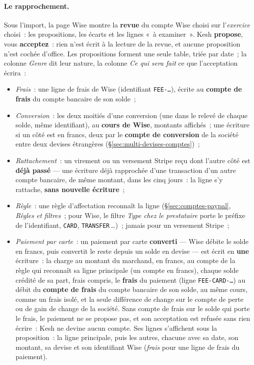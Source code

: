 \documentclass[a4paper,11pt,oneside]{article}
\begin{document}
\paragraph{Le rapprochement.} Sous l'import, la page Wise montre la \textbf{revue} du compte Wise choisi sur l'\emph{exercice} choisi~: les propositions, les écarts et les lignes «~à examiner~». Kesh \textbf{propose}, vous \textbf{acceptez}~: rien n'est écrit à la lecture de la revue, et aucune proposition n'est cochée d'office. Les propositions forment une seule table, triée par date~; la colonne \emph{Genre} dit leur nature, la colonne \emph{Ce qui sera fait} ce que l'acceptation écrira~:
\begin{itemize}
    \item \emph{Frais}~: une ligne de frais de Wise (identifiant \texttt{FEE-\dots}), écrite au \textbf{compte de frais} du compte bancaire de son solde~;
    \item \emph{Conversion}~: les deux moitiés d'une conversion (une dans le relevé de chaque solde, même identifiant), au \textbf{cours de Wise}, montants affichés~; une écriture si un côté est en francs, deux par le \textbf{compte de conversion} de la société entre deux devises étrangères (\S\ref{sec:multi-devises-comptes})~;
    \item \emph{Rattachement}~: un virement ou un versement Stripe reçu dont l'autre côté est \textbf{déjà passé} --- une écriture déjà rapprochée d'une transaction d'un autre compte bancaire, de même montant, dans les cinq jours~: la ligne s'y rattache, \textbf{sans nouvelle écriture}~;
    \item \emph{Règle}~: une règle d'affectation reconnaît la ligne (\S\ref{sec:comptes-paypal}, \emph{Règles et filtres}~; pour Wise, le filtre \emph{Type chez le prestataire} porte le préfixe de l'identifiant, \texttt{CARD}, \texttt{TRANSFER}\,\dots)~; jamais pour un versement Stripe~;
    \item \emph{Paiement par carte}~: un paiement par carte \textbf{converti} --- Wise débite le solde en francs, puis convertit le reste depuis un solde en devise --- est écrit en \textbf{une} écriture~: la charge au montant du marchand, en francs, au compte de la règle qui reconnaît sa ligne principale (un compte en francs), chaque solde crédité de sa part, frais compris, le \textbf{frais} du paiement (ligne \texttt{FEE-CARD-\dots}) au débit du \textbf{compte de frais} du compte bancaire de son solde, au même cours, comme un frais isolé, et la seule différence de change sur le compte de perte ou de gain de change de la société. Sans compte de frais sur le solde qui porte le frais, le paiement ne se propose pas, et son acceptation est refusée sans rien écrire~: Kesh ne devine aucun compte. Ses lignes s'affichent sous la proposition~: la ligne principale, puis les autres, chacune avec sa date, son montant, sa devise et son identifiant Wise (\emph{frais} pour une ligne de frais du paiement).
\end{itemize}
\end{document}
